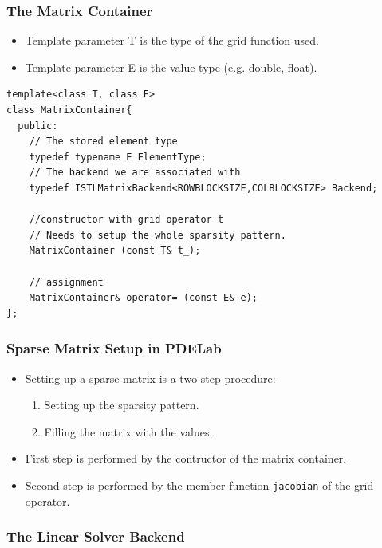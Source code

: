 \begin{frame}[fragile]
  \frametitle{The Matrix Container}
\begin{itemize}
  \item Template parameter T is the type of the grid function used.
  \item Template parameter E is the value type (e.g. double, float).
  \end{itemize}
  \begin{lstlisting}[basicstyle=\scriptsize]
template<class T, class E>
class MatrixContainer{
  public:
    // The stored element type
    typedef typename E ElementType;
    // The backend we are associated with
    typedef ISTLMatrixBackend<ROWBLOCKSIZE,COLBLOCKSIZE> Backend;
      
    //constructor with grid operator t
    // Needs to setup the whole sparsity pattern.
    MatrixContainer (const T& t_);
      
    // assignment
    MatrixContainer& operator= (const E& e);
};
  \end{lstlisting}
\end{frame}
\begin{frame}[fragile]
  \frametitle{Sparse Matrix Setup in PDELab}
  \begin{itemize}
  \item Setting up a sparse matrix is a two step procedure:
    \begin{enumerate}
    \item Setting up the sparsity pattern.
    \item Filling the matrix with the values.
    \end{enumerate}
  \item First step is performed by the contructor of the matrix
    container.
  \item Second step is performed by the member function
    \lstinline!jacobian! of the grid operator.
  \end{itemize}

\end{frame}

\subsubsection{The Linear Solver Backend}
\label{sec:line-solv-back}

